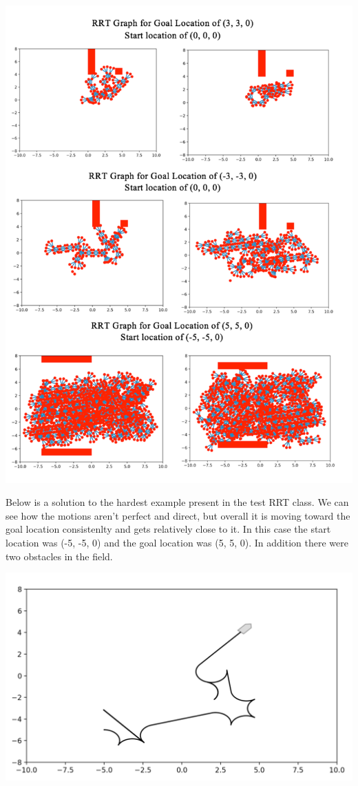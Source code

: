 \documentclass{article}
\begin{document}
\includegraphics[width=\textwidth]{rrt_graph_examples.pdf}

Below is a solution to the hardest example present in the test RRT class. We can see how the motions aren't perfect and direct, but overall it is moving toward the goal location consistenlty and gets relatively close to it. In this case the start location was (-5, -5, 0) and the goal location was (5, 5, 0). In addition there were two obstacles in the field. 

\includegraphics[width=\textwidth]{hard_test.pdf}
\end{document}
